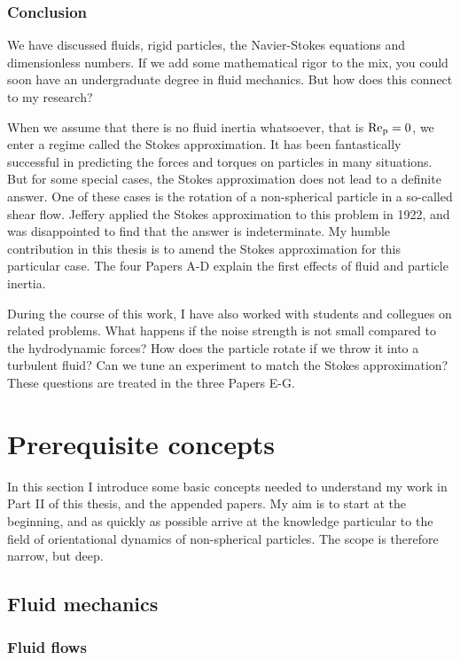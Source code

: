 \documentclass[thesis.tex]{subfiles}
\begin{document}
\subsection*{Conclusion}

We have discussed fluids, rigid particles, the Navier-Stokes equations and dimensionless numbers. If we add some mathematical rigor to the mix, you could soon have an undergraduate degree in fluid mechanics. But how does this connect to my research?

When we assume that there is no fluid inertia whatsoever, that is $\mbox{Re}_{\mathrm p}=0$, we enter a regime called the Stokes approximation. It has been fantastically successful in predicting the forces and torques on particles in many situations. But for some special cases, the Stokes approximation does not lead to a definite answer. One of these cases is the rotation of a non-spherical particle in a so-called shear flow. Jeffery applied the Stokes approximation to this problem in 1922, and was disappointed to find that the answer is indeterminate. My humble contribution in this thesis is to amend the Stokes approximation for this particular case. The four Papers A-D explain the first effects of fluid and particle inertia.

During the course of this work, I have also worked with students and collegues on related problems. What happens if the noise strength is not small compared to the hydrodynamic forces? How does the particle rotate if we throw it into a turbulent fluid? Can we tune an experiment to match the Stokes approximation? These questions are treated in the three Papers E-G.

\chapter{Prerequisite concepts}\label{sec:prerequisites}

In this section I introduce some basic concepts needed to understand my work in Part II of this thesis, and the appended papers. My aim is to start at the beginning, and as quickly as possible arrive at the knowledge particular to the field of orientational dynamics of non-spherical particles. The scope is therefore narrow, but deep.

\section{Fluid mechanics}

\subsection{Fluid flows}\label{sec:fluidflows}
\end{document}
